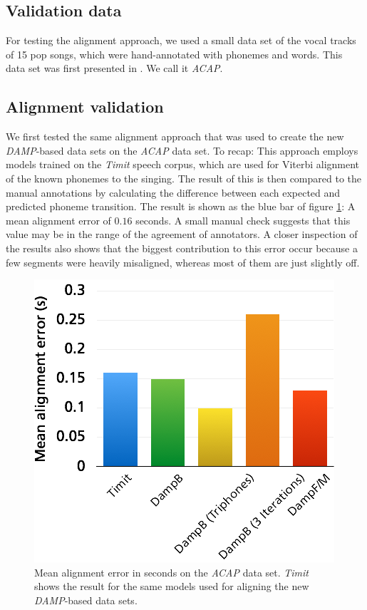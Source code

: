 \subsection{Validation data}\label{subsec:validation_data}
For testing the alignment approach, we used a small data set of the vocal tracks of 15 pop songs, which were hand-annotated with phonemes and words. This data set was first presented in \cite{jens}. We call it \textit{ACAP}.
\subsection{Alignment validation}
We first tested the same alignment approach that was used to create the new \textit{DAMP}-based data sets on the \textit{ACAP} data set. To recap: This approach employs models trained on the \textit{Timit} speech corpus, which are used for Viterbi alignment of the known phonemes to the singing. The result of this is then compared to the manual annotations by calculating the difference between each expected and predicted phoneme transition. The result is shown as the blue bar of figure \ref{fig:res_alignment}: A mean alignment error of $0.16$ seconds. A small manual check suggests that this value may be in the range of the agreement of annotators. A closer inspection of the results also shows that the biggest contribution to this error occur because a few segments were heavily misaligned, whereas most of them are just slightly off.\\
\begin{figure}
 \begin{center}
                \includegraphics[width=.4\textwidth]{images/res_alignment.png}
                \caption{Mean alignment error in seconds on the \textit{ACAP} data set. \textit{Timit} shows the result for the same models used for aligning the new \textit{DAMP}-based data sets.}
                \label{fig:res_alignment}
                 \end{center}
 \end{figure}
